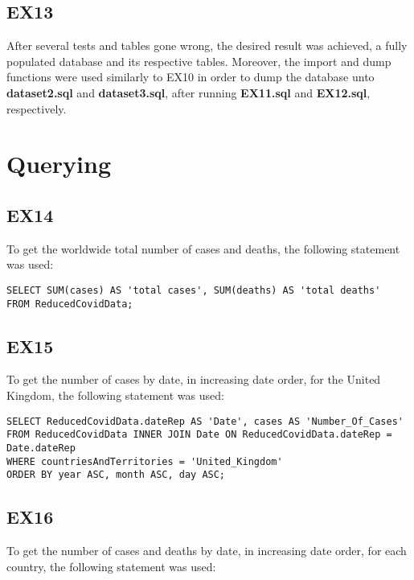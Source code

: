\documentclass{article}
\begin{document}
\subsection{EX13}

After several tests and tables gone wrong, the desired result was achieved, a fully populated database and its respective tables. 
Moreover, the import and dump functions were used similarly to EX10 in order to dump the database unto \textbf{dataset2.sql} and \textbf{dataset3.sql}, after running \textbf{EX11.sql} and \textbf{EX12.sql}, respectively.

\section{Querying}
\subsection{EX14}

To get the worldwide total number of cases and deaths, the following statement was used:

\begin{lstlisting}[caption={Querying worldwide total number of cases and deaths}]
SELECT SUM(cases) AS 'total cases', SUM(deaths) AS 'total deaths'
FROM ReducedCovidData;
\end{lstlisting}

\subsection{EX15}

To get the number of cases by date, in increasing date order, for the United Kingdom, the following statement was used:

\begin{lstlisting}[caption={Querying number of cases for the UK by increasing date}]
SELECT ReducedCovidData.dateRep AS 'Date', cases AS 'Number_Of_Cases'
FROM ReducedCovidData INNER JOIN Date ON ReducedCovidData.dateRep = Date.dateRep
WHERE countriesAndTerritories = 'United_Kingdom'
ORDER BY year ASC, month ASC, day ASC;
\end{lstlisting}

\subsection{EX16}

To get the number of cases and deaths by date, in increasing date order, for each country, the following statement was used:
\end{document}
